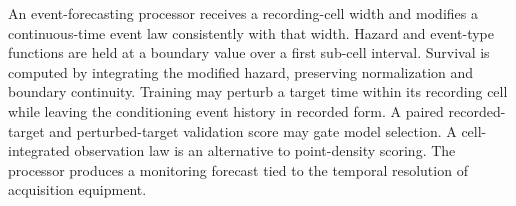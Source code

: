 \documentclass[pct]{sm-patent}
\begin{document}
\abstractstart

An event-forecasting processor receives a recording-cell width and modifies a continuous-time event law consistently with that width. Hazard and event-type functions are held at a boundary value over a first sub-cell interval. Survival is computed by integrating the modified hazard, preserving normalization and boundary continuity. Training may perturb a target time within its recording cell while leaving the conditioning event history in recorded form. A paired recorded-target and perturbed-target validation score may gate model selection. A cell-integrated observation law is an alternative to point-density scoring. The processor produces a monitoring forecast tied to the temporal resolution of acquisition equipment.
\end{document}
